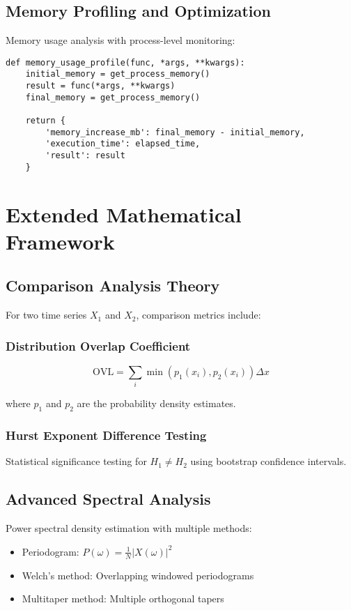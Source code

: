 \documentclass[11pt,a4paper]{article}
\begin{document}
\subsection{Memory Profiling and Optimization}

Memory usage analysis with process-level monitoring:

\begin{lstlisting}
def memory_usage_profile(func, *args, **kwargs):
    initial_memory = get_process_memory()
    result = func(*args, **kwargs)
    final_memory = get_process_memory()
    
    return {
        'memory_increase_mb': final_memory - initial_memory,
        'execution_time': elapsed_time,
        'result': result
    }
\end{lstlisting}

\section{Extended Mathematical Framework}

\subsection{Comparison Analysis Theory}

For two time series $X_1$ and $X_2$, comparison metrics include:

\subsubsection{Distribution Overlap Coefficient}
\begin{equation}
\text{OVL} = \sum_{i} \min(p_1(x_i), p_2(x_i)) \Delta x
\end{equation}

where $p_1$ and $p_2$ are the probability density estimates.

\subsubsection{Hurst Exponent Difference Testing}
Statistical significance testing for $H_1 \neq H_2$ using bootstrap confidence intervals.

\subsection{Advanced Spectral Analysis}

Power spectral density estimation with multiple methods:
\begin{itemize}
    \item Periodogram: $P(\omega) = \frac{1}{N}|X(\omega)|^2$
    \item Welch's method: Overlapping windowed periodograms
    \item Multitaper method: Multiple orthogonal tapers
\end{itemize}
\end{document}
